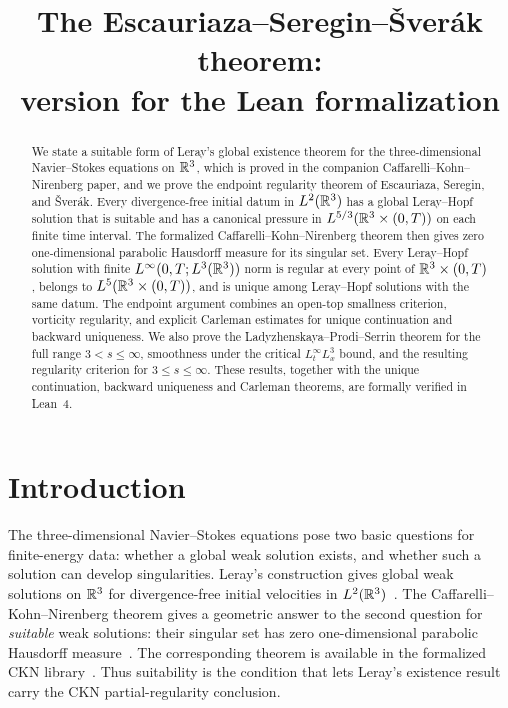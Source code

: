 \documentclass[11pt,letterpaper]{article}
\date{}
\title{The Escauriaza--Seregin--\v{S}ver\'ak theorem:\\ version for the Lean formalization}
\author{}
\numberwithin{equation}{section}
\theoremstyle{plain}
\theoremstyle{definition}
\theoremstyle{remark}
\begin{document}
\maketitle

\begin{abstract}
We state a suitable form of Leray's global existence theorem for the three-dimensional Navier--Stokes equations on $\mathbb{R}^3$, which is proved in the companion Caffarelli--Kohn--Nirenberg paper, and we prove the endpoint regularity theorem of Escauriaza, Seregin, and \v{S}ver\'ak. Every divergence-free initial datum in $L^2(\mathbb{R}^3)$ has a global Leray--Hopf solution that is suitable and has a canonical pressure in $L^{5/3}(\mathbb{R}^3\times(0,T))$ on each finite time interval. The formalized Caffarelli--Kohn--Nirenberg theorem then gives zero one-dimensional parabolic Hausdorff measure for its singular set. Every Leray--Hopf solution with finite $L^\infty(0,T;L^3(\mathbb{R}^3))$ norm is regular at every point of $\mathbb{R}^3\times(0,T)$, belongs to $L^5(\mathbb{R}^3\times(0,T))$, and is unique among Leray--Hopf solutions with the same datum. The endpoint argument combines an open-top smallness criterion, vorticity regularity, and explicit Carleman estimates for unique continuation and backward uniqueness. We also prove the Ladyzhenskaya--Prodi--Serrin theorem for the full range $3<s\le\infty$, smoothness under the critical $L^\infty_tL^3_x$ bound, and the resulting regularity criterion for $3\le s\le\infty$. These results, together with the unique continuation, backward uniqueness and Carleman theorems, are formally verified in Lean~4.
\end{abstract}

{\small
\tableofcontents
}
\clearpage

\section{Introduction}\label{sec:intro}

The three-dimensional Navier--Stokes equations pose two basic questions for finite-energy data: whether a global weak solution exists, and whether such a solution can develop singularities. Leray's construction gives global weak solutions on $\mathbb{R}^3$ for divergence-free initial velocities in $L^2(\mathbb{R}^3)$~\cite{Leray1934}. The Caffarelli--Kohn--Nirenberg theorem gives a geometric answer to the second question for \emph{suitable} weak solutions: their singular set has zero one-dimensional parabolic Hausdorff measure~\cite{CKN1982}. The corresponding theorem is available in the formalized CKN library~\cite{CKNLean}. Thus suitability is the condition that lets Leray's existence result carry the CKN partial-regularity conclusion.
\end{document}
